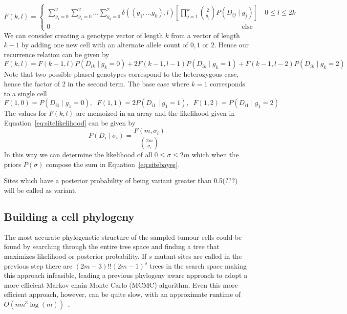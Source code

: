 \documentclass[../main.tex]{subfiles}
\begin{document}
\begin{equation}
F(k,l) = \begin{cases} \sum_{g_1=0}^2\sum_{g_2=0}^2\dots\sum_{g_k=0}^2 \delta((g_1,\dots g_k),l)\left[\prod_{j=1}^{k}\binom{2}{g_j}P(D_{ij}\mid g_{j})\right] \quad 0\leq l \leq 2k \\
0 \qquad\qquad\qquad\qquad\qquad\qquad\qquad\qquad\qquad\qquad\qquad\qquad\qquad\qquad \text{else} \end{cases}
\end{equation}
We can consider creating a genotype vector of length $k$ from a vector of length $k-1$ by adding one new cell with an alternate allele count of $0,1$ or $2$. Hence our recurrence relation can be given by
\begin{equation}
F(k,l) = F(k-1,l)P(D_{ik}\mid g_k = 0) + 2F(k-1,l-1)P(D_{ik}\mid g_k = 1) + F(k-1,l-2)P(D_{ik}\mid g_k = 2)
\end{equation}
Note that two possible phased genotypes correspond to the heterozygous case, hence the factor of 2 in the second term. The base case where $k=1$ corresponds to a single cell
\begin{equation*}
F(1,0) = P(D_{i1}\mid g_1 = 0),\;\; F(1,1) = 2P(D_{i1}\mid g_1=1),\;\; F(1,2) = P(D_{i1}\mid g_1 = 2)
\end{equation*}
The values for $F(k,l)$ are memoized in an array and the likelihood given in Equation~\ref{eq:sitelikelihood} can be given by
\begin{equation}
P(D_i\mid \sigma_i)=\frac{F(m,\sigma_i)}{\binom{2m}{\sigma_i}}
\end{equation}
In this way we can determine the likelihood of all $0\leq \sigma\leq 2m$ which when the priors $P(\sigma)$ compose the sum in Equation~\eqref{eq:sitebayes}.

Sites which have a posterior probability of being variant greater than 0.5(???) will be called as variant.
\subsection{Building a cell phylogeny}
The most accurate phylogenetic structure of the sampled tumour cells could be found by searching through the entire tree space and finding a tree that maximizes likelihood or posterior probability. If $s$ mutant sites are called in the previous step there are $(2m-3)!!(2m-1)^s$ trees in the search space making this approach infeasible, leading a previous phylogeny aware approach to adopt a more efficient Markov chain Monte Carlo (MCMC) algorithm. Even this more efficient approach, however, can be quite slow, with an approximate runtime of $O(nm^3\log(m))$~\cite{sciphi}.
\end{document}
